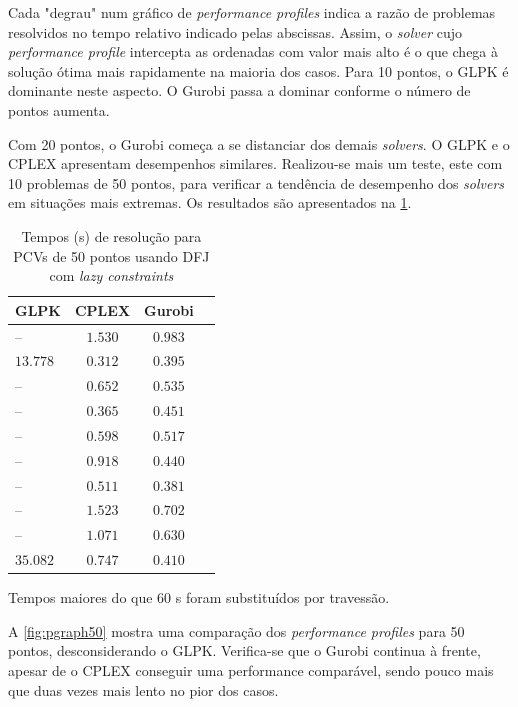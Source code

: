 Cada "degrau" num gráfico de \emph{performance profiles} indica a razão de problemas resolvidos no tempo relativo indicado pelas abscissas. Assim, o \emph{solver} cujo \emph{performance profile} intercepta as ordenadas com valor mais alto é o que chega à solução ótima mais rapidamente na maioria dos casos. Para 10 pontos, o GLPK é dominante neste aspecto. O Gurobi passa a dominar conforme o número de pontos aumenta.

Com 20 pontos, o Gurobi começa a se distanciar dos demais \emph{solvers}. O GLPK e o CPLEX apresentam desempenhos similares. Realizou-se mais um teste, este com 10 problemas de 50 pontos, para verificar a tendência de desempenho dos \emph{solvers} em situações mais extremas. Os resultados são apresentados na \cref{tab:tempos pcv50}.

\begin{table}
\centering
\caption{Tempos (s) de resolução para PCVs de 50 pontos usando DFJ com \emph{lazy constraints}}\label{tab:tempos pcv50}
\begin{threeparttable}
\begin{tabular}{lccc}
\toprule
GLPK & CPLEX & Gurobi\\\midrule
-- & $1.530$ & $\mathbf{0.983}$\\
$13.778$ & $\mathbf{0.312}$ & $0.395$\\
-- & $0.652$ & $\mathbf{0.535}$\\
-- & $\mathbf{0.365}$ & $0.451$\\
-- & $0.598$ & $\mathbf{0.517}$\\
-- & $0.918$ & $\mathbf{0.440}$\\
-- & $0.511$ & $\mathbf{0.381}$\\
-- & $1.523$ & $\mathbf{0.702}$\\
-- & $1.071$ & $\mathbf{0.630}$\\
$35.082$ & $0.747$ & $\mathbf{0.410}$\\
\bottomrule
\end{tabular}
\begin{tablenotes}
\item Tempos maiores do que 60 s foram substituídos por travessão.
\end{tablenotes}
\end{threeparttable}
\end{table}

A \cref{fig:pgraph50} mostra uma comparação dos \emph{performance profiles} para 50 pontos, desconsiderando o GLPK. Verifica-se que o Gurobi continua à frente, apesar de o CPLEX conseguir uma performance comparável, sendo pouco mais que duas vezes mais lento no pior dos casos.

